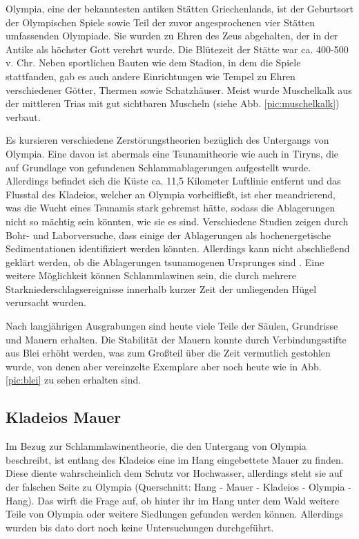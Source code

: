 \documentclass[preprint]{geomorphica} %
\begin{document}
Olympia, eine der bekanntesten antiken Stätten Griechenlands, ist der Geburtsort der Olympischen Spiele sowie Teil der zuvor angesprochenen vier Stätten umfassenden Olympiade. Sie wurden zu Ehren des Zeus abgehalten, der in der Antike als höchster Gott verehrt wurde. Die Blütezeit der Stätte war ca. 400-500 v. Chr. Neben sportlichen Bauten wie dem Stadion, in dem die Spiele stattfanden, gab es auch andere Einrichtungen wie Tempel zu Ehren verschiedener Götter, Thermen sowie Schatzhäuser. Meist wurde Muschelkalk aus der mittleren Trias mit gut sichtbaren Muscheln (siehe Abb. \ref{pic:muschelkalk}) verbaut.

Es kursieren verschiedene Zerstörungstheorien bezüglich des Untergangs von Olympia. Eine davon ist abermals eine Tsunamitheorie wie auch in Tiryns, die auf Grundlage von gefundenen Schlammablagerungen aufgestellt wurde. Allerdings befindet sich die Küste ca. 11,5 Kilometer Luftlinie entfernt und das Flusstal des Kladeios, welcher an Olympia vorbeifließt, ist eher meandrierend, was die Wucht eines Tsunamis stark gebremst hätte, sodass die Ablagerungen nicht so mächtig sein könnten, wie sie es sind. Verschiedene Studien zeigen durch Bohr- und Laborversuche, dass einige der Ablagerungen als hochenergetische Sedimentationen identifiziert werden könnten. Allerdings kann nicht abschließend geklärt werden, ob die Ablagerungen tsunamogenen Ursprunges sind \cite{Vött.Willershäuser.ea2019}. Eine weitere Möglichkeit können Schlammlawinen sein, die durch mehrere Starkniederschlagsereignisse innerhalb kurzer Zeit der umliegenden Hügel verursacht wurden.

Nach langjährigen Ausgrabungen sind heute viele Teile der Säulen, Grundrisse und Mauern erhalten. Die Stabilität der Mauern konnte durch Verbindungsstifte aus Blei erhöht werden, was zum Großteil über die Zeit vermutlich gestohlen wurde, von denen aber vereinzelte Exemplare aber noch heute wie in Abb. \ref{pic:blei} zu sehen erhalten sind.

\subsection{Kladeios Mauer}

Im Bezug zur Schlammlawinentheorie, die den Untergang von Olympia beschreibt, ist entlang des Kladeios eine im Hang eingebettete Mauer zu finden. Diese diente wahrscheinlich dem Schutz vor Hochwasser, allerdings steht sie auf der falschen Seite zu Olympia (Querschnitt: Hang - Mauer - Kladeios - Olympia - Hang). Das wirft die Frage auf, ob hinter ihr im Hang unter dem Wald weitere Teile von Olympia oder weitere Siedlungen gefunden werden können. Allerdings wurden bis dato dort noch keine Untersuchungen durchgeführt.
\end{document}
